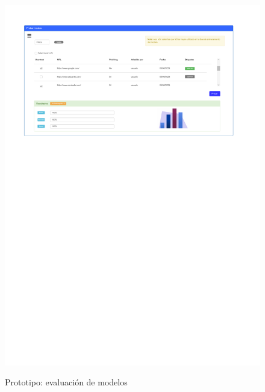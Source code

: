 \begin{figure}[h]
	\caption{Prototipo: evaluación de modelos}
	\centering
	\includegraphics[width=\textwidth]{../img/anexos/mockups/7-mockups-test_model}
	\label{mock:model-test}
\end{figure}

